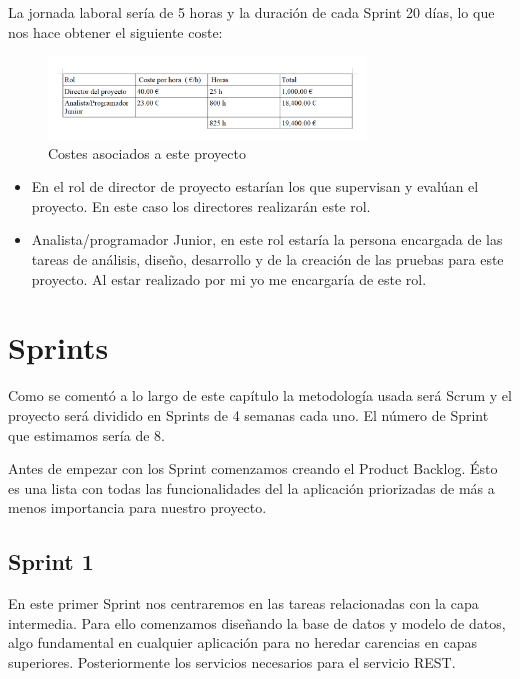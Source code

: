  La jornada laboral sería de 5 horas y la duración de cada Sprint 20 días, lo que nos hace obtener el siguiente coste:


\begin{figure}[H]
		\centering
		\includegraphics[width=0.75\textwidth] {coste.png}
		\caption{Costes asociados a este proyecto }
		\label{fig:coste}
	\end{figure}






\begin{itemize}
\item En el rol de director de proyecto estarían los que 
supervisan y evalúan el proyecto. En este caso los directores realizarán este rol.

\item Analista/programador Junior, en este rol estaría la persona encargada de las tareas de análisis, diseño, desarrollo y de la creación de las pruebas para este proyecto. Al estar realizado por mi yo me encargaría de este rol.





\end{itemize}
\section{Sprints}

Como se comentó a lo largo de este capítulo la metodología usada será  Scrum y el proyecto será dividido en Sprints de 4 semanas cada uno. El número de Sprint que estimamos sería de 8.




 Antes de empezar con los Sprint comenzamos creando el Product Backlog. Ésto es una lista con todas las funcionalidades del la aplicación priorizadas de más a menos importancia para nuestro proyecto. 

\subsection{Sprint 1}

En este primer Sprint nos centraremos en las tareas relacionadas con la capa intermedia. Para ello comenzamos diseñando la base de datos y modelo de datos, algo fundamental en cualquier aplicación para no heredar carencias en capas superiores. Posteriormente los servicios necesarios para el servicio REST.


